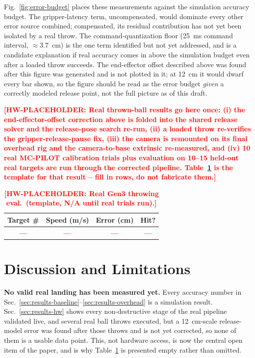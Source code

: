 \documentclass[conference]{IEEEtran}
\newcommand{\hwtodo}[1]{\textcolor{red}{\textbf{[HW-PLACEHOLDER: #1]}}}
\newcommand{\hwdash}{\textcolor{red}{\textbf{---}}}
\begin{document}
Fig.~\ref{fig:error-budget} places these measurements against the
simulation accuracy budget. The gripper-latency term, uncompensated, would
dominate every other error source combined; compensated, its residual
contribution has not yet been isolated by a real throw. The
command-quantization floor (25~ms command interval, $\approx$3.7~cm) is
the one term identified but not yet addressed, and is a candidate
explanation if real accuracy comes in above the simulation budget even
after a loaded throw succeeds. The end-effector offset described above was
found after this figure was generated and is not plotted in it; at 12~cm
it would dwarf every bar shown, so the figure should be read as the error
budget \emph{given} a correctly modeled release point, not the full picture
as of this draft.

\hwtodo{Real thrown-ball results go here once: (i) the end-effector-offset
correction above is folded into the shared release solver and the
release-pose search re-run, (ii) a loaded throw re-verifies the
gripper-release-pause fix, (iii) the camera is remounted on its final
overhead rig and the camera-to-base extrinsic re-measured, and (iv) 10 real
MC-PILOT calibration trials plus evaluation on 10--15 held-out real targets
are run through the corrected pipeline. Table~\ref{tab:hw-results} is the
template for that result -- fill in rows, do not fabricate them.}

\begin{table}[t]
\centering
\small
\caption{\hwtodo{Real Gen3 throwing eval.\ (template, N/A until real
trials run).}}
\label{tab:hw-results}
\begin{tabular}{@{}cccc@{}}
\toprule
Target \# & Speed (m/s) & Error (cm) & Hit? \\
\midrule
\hwdash & \hwdash & \hwdash & \hwdash \\
\bottomrule
\end{tabular}
\end{table}

\section{Discussion and Limitations}

\textbf{No valid real landing has been measured yet.} Every accuracy number
in Sec.~\ref{sec:results-baseline}--\ref{sec:results-overhead} is a
simulation result. Sec.~\ref{sec:results-hw} shows every non-destructive
stage of the real pipeline validated live, and several real ball throws
executed, but a 12~cm-scale release-model error was found after those
throws and is not yet corrected, so none of them is a usable data point.
This, not hardware access, is now the central open item of the paper, and
is why Table~\ref{tab:hw-results} is presented empty rather than omitted.
\end{document}
